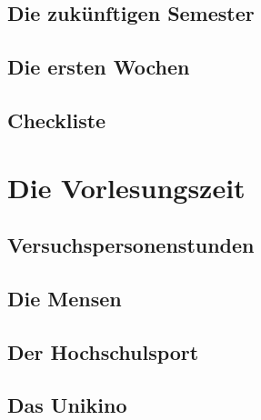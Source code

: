 \documentclass[12pt, a4paper]{article}
\newif\ifinfo
\begin{document}
	\subsection{Die zukünftigen Semester}
	

	\pagebreak

	\subsection{Die ersten Wochen}
	
\fi

\pagebreak

\subsection{Checkliste}
\ifinfo
	
\else
	
\fi


\ifinfo
        \vspace{-1em} %
\fi
\section{Die Vorlesungszeit}
\ifinfo
	\subsection{Der Stundenplan}
	
	
\else
	\subsection{Versuchspersonenstunden}
	
\fi

\subsection{Die Mensen}


\subsection{Der Hochschulsport}


\subsection{Das Unikino}

\end{document}
